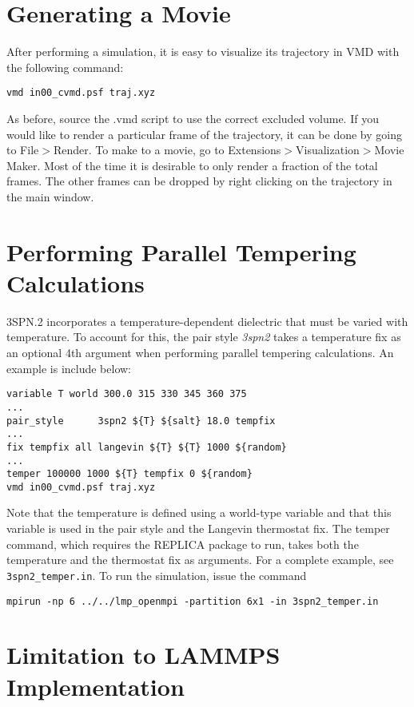 \documentclass[11pt]{amsart}
\begin{document}
\section{Generating a Movie}

After performing a simulation, it is easy to visualize its trajectory in VMD
with the following command:
\begin{verbatim}
vmd in00_cvmd.psf traj.xyz
\end{verbatim}
As before, source the .vmd script to use the correct excluded volume.   If you
would like to render a particular frame of the trajectory, it can be done by
going to File$>$Render.  To make to a movie, go to
Extensions$>$Visualization$>$Movie Maker.   Most of the time it is desirable to
only render a fraction of the total frames.   The other frames can be dropped
by right clicking on the trajectory in the main window.

\section{Performing Parallel Tempering Calculations}
3SPN.2 incorporates a temperature-dependent dielectric that must be varied with temperature.
To account for this, the pair style \emph{3spn2} takes a temperature fix as an optional 4th argument when performing parallel tempering calculations. 
An example is include below:
\begin{verbatim}
variable T world 300.0 315 330 345 360 375
...
pair_style      3spn2 ${T} ${salt} 18.0 tempfix
...
fix tempfix all langevin ${T} ${T} 1000 ${random}
...
temper 100000 1000 ${T} tempfix 0 ${random}
vmd in00_cvmd.psf traj.xyz
\end{verbatim}
Note that the temperature is defined using a world-type variable and that this
variable is used in the pair style and the Langevin thermostat fix.  The temper
command, which requires the REPLICA package to run, takes both the temperature
and the thermostat fix as arguments.   For a complete example, see
\texttt{3spn2\_temper.in}. To run the simulation, issue the command
\begin{verbatim}
mpirun -np 6 ../../lmp_openmpi -partition 6x1 -in 3spn2_temper.in
\end{verbatim}


\section{Limitation to LAMMPS Implementation}
\end{document}
